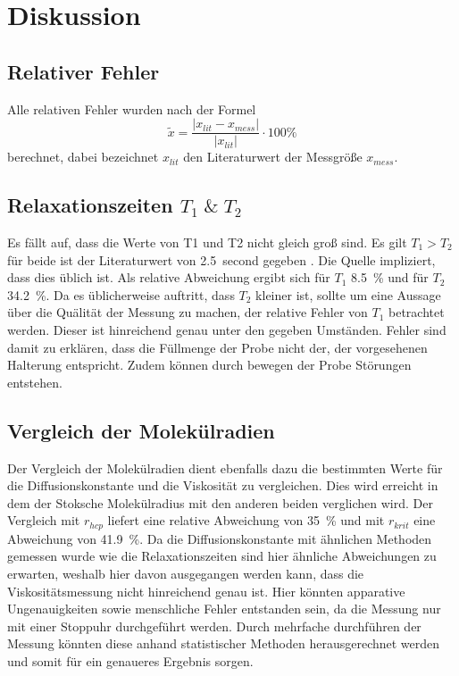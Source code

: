 \section{Diskussion}
\label{sec:Diskussion}
\subsection{Relativer Fehler}
Alle relativen Fehler wurden nach der Formel
\begin{equation*}
  \tilde{x} = \frac{ \lvert x_{lit} - x_{mess} \rvert}{\lvert x_{lit} \rvert}
  \cdot 100 \%
\end{equation*}
berechnet, dabei bezeichnet $x_{lit}$ den Literaturwert der Messgröße $x_{mess}$.
\subsection{Relaxationszeiten \texorpdfstring{$T_1 \; \& \; T_2$}{math}}
Es fällt auf, dass die Werte von T1 und T2 nicht gleich groß sind. Es gilt $T_1 > T_2$ für beide
ist der Literaturwert von \SI{2,5}{second} gegeben \cite{hyper}. Die Quelle impliziert, dass dies üblich ist. Als
relative Abweichung ergibt sich für $T_1$ \SI{8,5}{\percent} und für $T_2$ \SI{34,2}{\percent}. Da es üblicherweise auftritt,
dass $T_2$ kleiner ist, sollte um eine Aussage über die Quälität der Messung zu machen, der relative Fehler von $T_1$
betrachtet werden. Dieser ist hinreichend genau unter den gegeben Umständen. Fehler sind damit zu erklären, dass die
Füllmenge der Probe nicht der, der vorgesehenen Halterung entspricht. Zudem können durch bewegen der Probe Störungen
entstehen.
\subsection{Vergleich der Molekülradien}
Der Vergleich der Molekülradien dient ebenfalls dazu die bestimmten Werte für die Diffusionskonstante und
die Viskosität zu vergleichen. Dies wird erreicht in dem der Stoksche Molekülradius mit den anderen beiden verglichen wird.
Der Vergleich mit $r_{hcp}$ liefert eine relative Abweichung von \SI{35}{\percent} und mit $r_{krit}$ eine Abweichung von
\SI{41,9}{\percent}. Da die Diffusionskonstante mit ähnlichen Methoden gemessen wurde wie die Relaxationszeiten sind hier
ähnliche Abweichungen zu erwarten, weshalb hier davon ausgegangen werden kann, dass die Viskositätsmessung nicht
hinreichend genau ist. Hier könnten apparative Ungenauigkeiten sowie menschliche Fehler entstanden sein, da die Messung
nur mit einer Stoppuhr durchgeführt werden. Durch mehrfache durchführen der Messung könnten diese anhand statistischer Methoden 
herausgerechnet werden und somit für ein genaueres Ergebnis sorgen.
